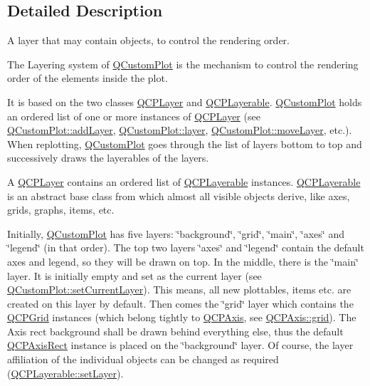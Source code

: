 \subsection{Detailed Description}
A layer that may contain objects, to control the rendering order. 

The Layering system of \hyperlink{class_q_custom_plot}{Q\+Custom\+Plot} is the mechanism to control the rendering order of the elements inside the plot.

It is based on the two classes \hyperlink{class_q_c_p_layer}{Q\+C\+P\+Layer} and \hyperlink{class_q_c_p_layerable}{Q\+C\+P\+Layerable}. \hyperlink{class_q_custom_plot}{Q\+Custom\+Plot} holds an ordered list of one or more instances of \hyperlink{class_q_c_p_layer}{Q\+C\+P\+Layer} (see \hyperlink{class_q_custom_plot_ad5255393df078448bb6ac83fa5db5f52}{Q\+Custom\+Plot\+::add\+Layer}, \hyperlink{class_q_custom_plot_a0a96244e7773b242ef23c32b7bdfb159}{Q\+Custom\+Plot\+::layer}, \hyperlink{class_q_custom_plot_ae896140beff19424e9e9e02d6e331104}{Q\+Custom\+Plot\+::move\+Layer}, etc.). When replotting, \hyperlink{class_q_custom_plot}{Q\+Custom\+Plot} goes through the list of layers bottom to top and successively draws the layerables of the layers.

A \hyperlink{class_q_c_p_layer}{Q\+C\+P\+Layer} contains an ordered list of \hyperlink{class_q_c_p_layerable}{Q\+C\+P\+Layerable} instances. \hyperlink{class_q_c_p_layerable}{Q\+C\+P\+Layerable} is an abstract base class from which almost all visible objects derive, like axes, grids, graphs, items, etc.

Initially, \hyperlink{class_q_custom_plot}{Q\+Custom\+Plot} has five layers\+: \char`\"{}background\char`\"{}, \char`\"{}grid\char`\"{}, \char`\"{}main\char`\"{}, \char`\"{}axes\char`\"{} and \char`\"{}legend\char`\"{} (in that order). The top two layers \char`\"{}axes\char`\"{} and \char`\"{}legend\char`\"{} contain the default axes and legend, so they will be drawn on top. In the middle, there is the \char`\"{}main\char`\"{} layer. It is initially empty and set as the current layer (see \hyperlink{class_q_custom_plot_a73a6dc47c653bb6f8f030abca5a11852}{Q\+Custom\+Plot\+::set\+Current\+Layer}). This means, all new plottables, items etc. are created on this layer by default. Then comes the \char`\"{}grid\char`\"{} layer which contains the \hyperlink{class_q_c_p_grid}{Q\+C\+P\+Grid} instances (which belong tightly to \hyperlink{class_q_c_p_axis}{Q\+C\+P\+Axis}, see \hyperlink{class_q_c_p_axis_a63f1dd2df663680d2a8d06c19592dd63}{Q\+C\+P\+Axis\+::grid}). The Axis rect background shall be drawn behind everything else, thus the default \hyperlink{class_q_c_p_axis_rect}{Q\+C\+P\+Axis\+Rect} instance is placed on the \char`\"{}background\char`\"{} layer. Of course, the layer affiliation of the individual objects can be changed as required (\hyperlink{class_q_c_p_layerable_ab0d0da6d2de45a118886d2c8e16d5a54}{Q\+C\+P\+Layerable\+::set\+Layer}).

